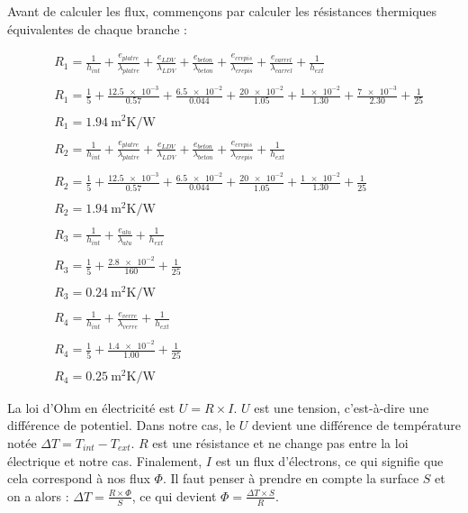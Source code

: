 \documentclass[12pt, a4paper]{article}
\newcommand{\TInt}{\ensuremath{T_{int}}}
\newcommand{\TExt}{\ensuremath{T_{ext}}}
\newcommand{\hInt}{\ensuremath{h_{int}}}
\newcommand{\hExt}{\ensuremath{h_{ext}}}
\newcommand{\RUn}{\ensuremath{R_{1}}}
\newcommand{\RDeux}{\ensuremath{R_{2}}}
\newcommand{\RTrois}{\ensuremath{R_{3}}}
\newcommand{\RQuatre}{\ensuremath{R_{4}}}
\newcommand{\lambdaAlu}{\ensuremath{\lambda_{alu}}}
\newcommand{\lambdaVerre}{\ensuremath{\lambda_{verre}}}
\newcommand{\lambdaPlatre}{\ensuremath{\lambda_{platre}}}
\newcommand{\lambdaLDV}{\ensuremath{\lambda_{LDV}}}
\newcommand{\lambdaBeton}{\ensuremath{\lambda_{beton}}}
\newcommand{\lambdaCrepis}{\ensuremath{\lambda_{crepis}}}
\newcommand{\lambdaCarrel}{\ensuremath{\lambda_{carrel}}}
\newcommand{\ePlatre}{\ensuremath{e_{platre}}}
\newcommand{\eLDV}{\ensuremath{e_{LDV}}}
\newcommand{\eBeton}{\ensuremath{e_{beton}}}
\newcommand{\eCrepis}{\ensuremath{e_{crepis}}}
\newcommand{\eCarrel}{\ensuremath{e_{carrel}}}
\newcommand{\eAlu}{\ensuremath{e_{alu}}}
\newcommand{\eVerre}{\ensuremath{e_{verre}}}
\newcommand{\deltaT}{\ensuremath{\Delta T}}
\begin{document}
Avant de calculer les flux, commençons par calculer les résistances thermiques équivalentes de chaque branche : 

\bigskip

\begin{align*}
 & \RUn  = \frac{1}{\hInt} + \frac{\ePlatre}{\lambdaPlatre} + \frac{\eLDV}{\lambdaLDV} + \frac{\eBeton}{\lambdaBeton} + \frac{\eCrepis}{\lambdaCrepis} + \frac{\eCarrel}{\lambdaCarrel} + \frac{1}{\hExt} \\ \\
 & \RUn = \frac{1}{5} + \frac{\num{12.5e-3}}{0.57} + \frac{\num{6.5e-2}}{0.044} + \frac{\num{20e-2}}{1.05} + \frac{\num{1e-2}}{1.30} + \frac{\num{7e-3}}{2.30} + \frac{1}{25} \\ \\
 & \boxed{\RUn = \SI{1.94}{\meter\squared\kelvin\per\watt}} \\ \\
 & \RDeux  = \frac{1}{\hInt} + \frac{\ePlatre}{\lambdaPlatre} + \frac{\eLDV}{\lambdaLDV} + \frac{\eBeton}{\lambdaBeton} + \frac{\eCrepis}{\lambdaCrepis} + \frac{1}{\hExt} \\ \\
 & \RDeux = \frac{1}{5} + \frac{\num{12.5e-3}}{0.57} + \frac{\num{6.5e-2}}{0.044} + \frac{\num{20e-2}}{1.05} + \frac{\num{1e-2}}{1.30} + \frac{1}{25} \\ \\
 & \boxed{\RDeux = \SI{1.94}{\meter\squared\kelvin\per\watt}} \\ \\
 & \RTrois  = \frac{1}{\hInt} + \frac{\eAlu}{\lambdaAlu} + \frac{1}{\hExt} \\ \\
 & \RTrois = \frac{1}{5} + \frac{\num{2.8e-2}}{160} + \frac{1}{25} \\ \\
 & \boxed{\RTrois = \SI{0.24}{\meter\squared\kelvin\per\watt}} \\ \\
 & \RQuatre  = \frac{1}{\hInt} + \frac{\eVerre}{\lambdaVerre} + \frac{1}{\hExt} \\ \\
 & \RQuatre = \frac{1}{5} + \frac{\num{1.4e-2}}{1.00} + \frac{1}{25} \\ \\
 & \boxed{\RQuatre = \SI{0.25}{\meter\squared\kelvin\per\watt}}
\end{align*}

\bigskip

La loi d'Ohm en électricité est $U = R \times I$. $U$ est une tension, c'est-à-dire une différence de potentiel. Dans notre cas, le $U$ devient une différence de température notée $\deltaT = \TInt - \TExt$. $R$ est une résistance et ne change pas entre la loi électrique et notre cas. Finalement, $I$ est un flux d'électrons, ce qui signifie que cela correspond à nos flux $\Phi$. Il faut penser à prendre en compte la surface $S$ et on a alors : $\deltaT = \frac{R \times \Phi}{S}$, ce qui devient $\Phi = \frac{\deltaT \times S}{R}$.
\end{document}
